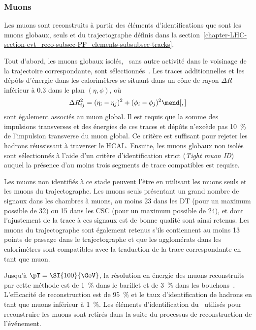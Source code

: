 \subsubsection{Muons}
Les muons sont reconstruits à partir des éléments d'identifications que sont les muons globaux, seuls et du trajectographe définis dans la section~\ref{chapter-LHC-section-evt_reco-subsec-PF_elements-subsubsec-tracks}.
\par Tout d'abord, les muons globaux isolés, \ie\ sans autre activité dans le voisinage de la trajectoire correspondante, sont sélectionnés~\cite{particle-flow}.
Les traces additionnelles et les dépôts d'énergie dans les calorimètres se situant dans un cône de rayon $\Delta R$ inférieur à \num{0.3} dans le plan $(\eta,\phi)$, où
\begin{equation}
\Delta R_{ij}^2 = (\eta_i-\eta_j)^2 + (\phi_i-\phi_j)^2
\mend[,]
\end{equation}
sont également associés au muon global.
Il est requis que la somme des impulsions transverses et des énergies de ces traces et dépôts n'excède pas \SI{10}{\%} de l'impulsion transverse du muon global.
Ce critère est suffisant pour rejeter les hadrons réussissant à traverser le HCAL.
Ensuite, les muons globaux non isolés sont sélectionnés à l'aide d'un critère d'identification strict (\emph{Tight muon ID})~\cite{CMS-MUO-16-001} auquel la présence d'au moins trois segments de trace compatibles est requise.
\par Les muons non identifiés à ce stade peuvent l'être en utilisant les muons seuls et les muons du trajectographe.
Les muons seuls présentant un grand nombre de signaux dans les chambres à muons, au moins 23 dans les DT (pour un maximum possible de 32) ou 15 dans les CSC (pour un maximum possible de 24), et dont l'ajustement de la trace à ces signaux est de bonne qualité sont ainsi retenus.
Les muons du trajectographe sont également retenus s'ils contiennent au moins 13 points de passage dans le trajectographe et que les agglomérats dans les calorimètres sont compatibles avec la traduction de la trace correspondante en tant que muon.
\par Jusqu'à $\pT=\SI{100}{\GeV}$, la résolution en énergie des muons reconstruits par cette méthode est de \SI{1}{\%} dans le barillet et de \SI{3}{\%} dans les bouchons~\cite{CMS-MUO-16-001}.
L'efficacité de reconstruction est de \SI{95}{\%} et le taux d'identification de hadrons en tant que muons inférieur à \SI{1}{\%}.
Les éléments d'identification du \PF\ utilisés pour reconstruire les muons sont retirés dans la suite du processus de reconstruction de l'événement.
